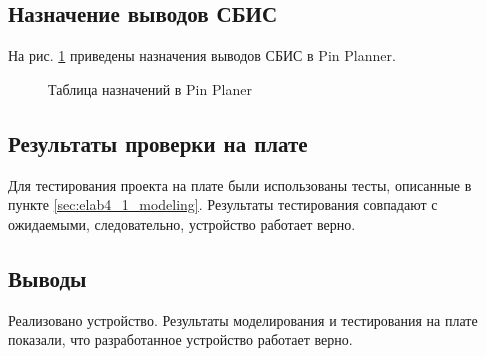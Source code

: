 \subsection{Назначение выводов СБИС}

На рис. \ref{fig:elab4_1_pins} приведены назначения выводов СБИС в Pin Planner.

\begin{figure}[H]
\begin{center}
	\caption{Таблица назначений в Pin Planer}
	\label{fig:elab4_1_pins}
\end{center}
\end{figure}

\subsection{Результаты проверки на плате}

Для тестирования проекта на плате были использованы тесты, описанные в пункте \ref{sec:elab4_1_modeling}. Результаты тестирования совпадают с ожидаемыми, следовательно, устройство работает верно.

\subsection{Выводы}

Реализовано устройство. Результаты моделирования и тестирования на плате показали, что разработанное устройство работает верно.

